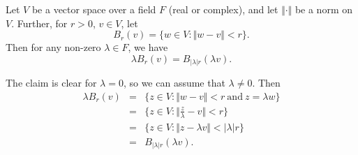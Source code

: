 \documentclass[12pt]{article}
\begin{document}

Let $V$ be a vector space over a field $F$ (real or complex), and let 
$\Vert\cdot \Vert$ be a norm on $V$. Further, 
for $r>0$, $v\in V$, let
$$
 B_r(v) = \{ w\in V: \Vert w-v\Vert < r \}.
$$
Then for any non-zero $\lambda\in F$, we have 
$$
  \lambda B_r(v) = B_{|\lambda| r}(\lambda v).
$$

The claim is clear for $\lambda =0$, so we can assume that $\lambda \neq 0$. 
Then
\begin{eqnarray*}
\lambda B_r(v) &=&  \{ z\in V: \Vert w-v\Vert < r\ \mbox{and}\ z=\lambda w \} \\
               &=&  \{ z\in V: \Vert \frac{z}{\lambda}-v\Vert < r \} \\
               &=&  \{ z\in V: \Vert z-\lambda v\Vert < |\lambda| r \} \\
               &=&  B_{|\lambda| r}(\lambda v).
\end{eqnarray*}
\end{document}
